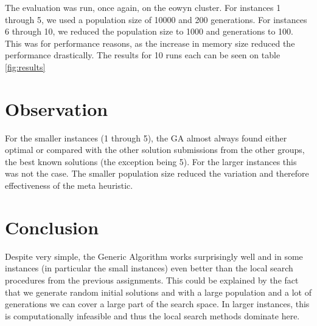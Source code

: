 \documentclass [11pt]{article}
\begin{document}
The evaluation was run, once again, on the eowyn cluster. For instances 1 through 5, we used a population size of 10000 and 200 generations. For instances 6 through 10, we reduced the population size to 1000 and generations to 100. This was for performance reasons, as the increase in memory size reduced the performance drastically. The results for 10 runs each can be seen on table \ref{fig:results}


\section{Observation}
For the smaller instances (1 through 5), the GA almost always found either optimal or compared with the other solution submissions from the other groups, the best known solutions (the exception being 5). For the larger instances this was not the case. The smaller population size reduced the variation and therefore effectiveness of the meta heuristic. 

\section{Conclusion}

Despite very simple, the Generic Algorithm works surprisingly well and in some instances (in particular the small instances) even better than the local search procedures from the previous assignments. This could be explained by the fact that we generate random initial solutions and with a large population and a lot of generations we can cover a large part of the search space. In larger instances, this is computationally infeasible and thus the local search methods dominate here. 

\newpage
\end{document}
